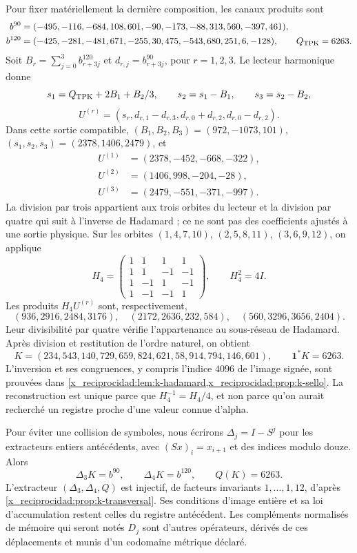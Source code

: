 Pour fixer matériellement la dernière composition, les canaux produits sont
\begin{align*}
 b^{90}&=(-495,-116,-684,108,601,-90,
                -173,-88,313,560,-397,461),\\
 b^{120}&=(-425,-281,-481,671,-255,30,
                 475,-543,680,251,6,-128),\qquad Q_{\rm TPK}=6263.
\end{align*}
Soit \(B_r=\sum_{j=0}^3b^{120}_{r+3j}\) et \(d_{r,j}=b^{90}_{r+3j}\), pour \(r=1,2,3\). Le lecteur harmonique donne
\[
 s_1=\frac{Q_{\rm TPK}+2B_1+B_2}{3},\qquad
 s_2=s_1-B_1,\qquad s_3=s_2-B_2,
\]
\[
 U^{(r)}=(s_r,d_{r,1}-d_{r,3},d_{r,0}+d_{r,2},d_{r,0}-d_{r,2}).
\]
Dans cette sortie compatible, \((B_1,B_2,B_3)=(972,-1073,101)\),
\((s_1,s_2,s_3)=(2378,1406,2479)\), et
\begin{align*}
 U^{(1)}&=(2378,-452,-668,-322),\\
 U^{(2)}&=(1406,998,-204,-28),\\
 U^{(3)}&=(2479,-551,-371,-997).
\end{align*}
La division par trois appartient aux trois orbites du lecteur et la division par quatre qui suit à l'inverse de Hadamard ; ce ne sont pas des coefficients ajustés à une sortie physique. Sur les orbites \((1,4,7,10)\), \((2,5,8,11)\), \((3,6,9,12)\), on applique
\[
 H_4=\begin{pmatrix}
 1&1&1&1\\1&1&-1&-1\\1&-1&1&-1\\1&-1&-1&1
 \end{pmatrix},\qquad H_4^2=4I.
\]
Les produits \(H_4U^{(r)}\) sont, respectivement,
\[
 (936,2916,2484,3176),\quad(2172,2636,232,584),
 \quad(560,3296,3656,2404).
\]
Leur divisibilité par quatre vérifie l’appartenance au sous-réseau de
Hadamard. Après division et restitution de l’ordre naturel, on obtient
\begin{equation}
 K=(234,543,140,729,659,824,621,58,914,794,146,601),
 \qquad\mathbf1^*K=6263.
 \label{x_reciprocidad:lib01:K}
\end{equation}
L’inversion et ses congruences, y compris l’indice \(4096\) de l’image
signée, sont prouvées dans \cref{x_reciprocidad:lem:k-hadamard,x_reciprocidad:prop:k-sello}. La
reconstruction est unique parce que \(H_4^{-1}=H_4/4\), et non parce qu’on aurait
recherché un registre proche d’une valeur connue d’alpha.

Pour éviter une collision de symboles, nous écrirons
\(\Delta_j=I-S^j\) pour les extracteurs entiers antécédents, avec
\((Sx)_i=x_{i+1}\) et des indices modulo douze. Alors
\[
 \Delta_3K=b^{90},\qquad \Delta_4K=b^{120},\qquad Q(K)=6263.
\]
L'extracteur \((\Delta_3,\Delta_4,Q)\) est injectif, de facteurs invariants \(1,\ldots,1,12\), d'après \cref{x_reciprocidad:prop:k-transversal}. Ses conditions d'image entière et sa loi d'accumulation restent celles du registre antécédent. Les compléments normalisés de mémoire qui seront notés \(D_j\) sont d'autres opérateurs, dérivés de ces déplacements et munis d'un codomaine métrique déclaré.

